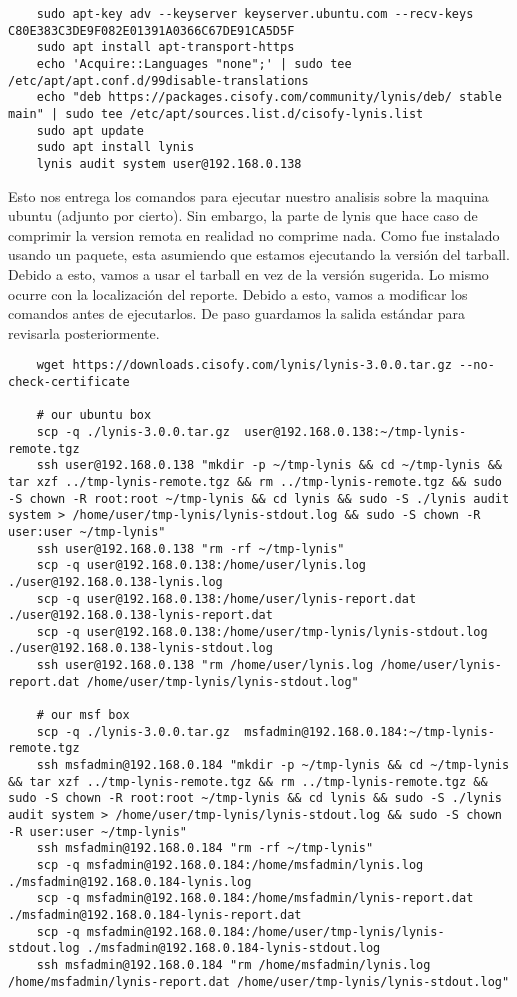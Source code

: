 \documentclass[11pt]{utalcaDoc}
\begin{document}
\begin{verbatim}
	sudo apt-key adv --keyserver keyserver.ubuntu.com --recv-keys C80E383C3DE9F082E01391A0366C67DE91CA5D5F
	sudo apt install apt-transport-https
	echo 'Acquire::Languages "none";' | sudo tee /etc/apt/apt.conf.d/99disable-translations
	echo "deb https://packages.cisofy.com/community/lynis/deb/ stable main" | sudo tee /etc/apt/sources.list.d/cisofy-lynis.list
	sudo apt update
	sudo apt install lynis
	lynis audit system user@192.168.0.138
\end{verbatim}

Esto nos entrega los comandos para ejecutar nuestro analisis sobre la maquina ubuntu (adjunto por cierto). Sin embargo, la parte de lynis que hace caso de comprimir la version remota en realidad no comprime nada. Como fue instalado usando un paquete, esta asumiendo que estamos ejecutando la versión del tarball. Debido a esto, vamos a usar el tarball en vez de la versión sugerida. Lo mismo ocurre con la localización del reporte. Debido a esto, vamos a modificar los comandos antes de ejecutarlos. De paso guardamos la salida estándar para revisarla posteriormente.

\begin{verbatim}
	wget https://downloads.cisofy.com/lynis/lynis-3.0.0.tar.gz --no-check-certificate

	# our ubuntu box
	scp -q ./lynis-3.0.0.tar.gz  user@192.168.0.138:~/tmp-lynis-remote.tgz
    ssh user@192.168.0.138 "mkdir -p ~/tmp-lynis && cd ~/tmp-lynis && tar xzf ../tmp-lynis-remote.tgz && rm ../tmp-lynis-remote.tgz && sudo -S chown -R root:root ~/tmp-lynis && cd lynis && sudo -S ./lynis audit system > /home/user/tmp-lynis/lynis-stdout.log && sudo -S chown -R user:user ~/tmp-lynis"
    ssh user@192.168.0.138 "rm -rf ~/tmp-lynis"
    scp -q user@192.168.0.138:/home/user/lynis.log ./user@192.168.0.138-lynis.log
	scp -q user@192.168.0.138:/home/user/lynis-report.dat ./user@192.168.0.138-lynis-report.dat
	scp -q user@192.168.0.138:/home/user/tmp-lynis/lynis-stdout.log ./user@192.168.0.138-lynis-stdout.log
	ssh user@192.168.0.138 "rm /home/user/lynis.log /home/user/lynis-report.dat /home/user/tmp-lynis/lynis-stdout.log"
	
	# our msf box
	scp -q ./lynis-3.0.0.tar.gz  msfadmin@192.168.0.184:~/tmp-lynis-remote.tgz
    ssh msfadmin@192.168.0.184 "mkdir -p ~/tmp-lynis && cd ~/tmp-lynis && tar xzf ../tmp-lynis-remote.tgz && rm ../tmp-lynis-remote.tgz && sudo -S chown -R root:root ~/tmp-lynis && cd lynis && sudo -S ./lynis audit system > /home/user/tmp-lynis/lynis-stdout.log && sudo -S chown -R user:user ~/tmp-lynis"
    ssh msfadmin@192.168.0.184 "rm -rf ~/tmp-lynis"
    scp -q msfadmin@192.168.0.184:/home/msfadmin/lynis.log ./msfadmin@192.168.0.184-lynis.log
    scp -q msfadmin@192.168.0.184:/home/msfadmin/lynis-report.dat ./msfadmin@192.168.0.184-lynis-report.dat
    scp -q msfadmin@192.168.0.184:/home/user/tmp-lynis/lynis-stdout.log ./msfadmin@192.168.0.184-lynis-stdout.log
    ssh msfadmin@192.168.0.184 "rm /home/msfadmin/lynis.log /home/msfadmin/lynis-report.dat /home/user/tmp-lynis/lynis-stdout.log"
\end{verbatim}
\end{document}
